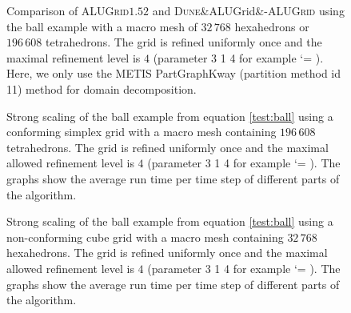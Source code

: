 \documentclass[10pt,notitlepage,a4paper]{article}
\makeatletter
\newcommand{\dune}[1][]{\textsc{Dune}\ifx&#1&\else\textsc{-{#1}}\fi\xspace}
\newcommand{\alugrid}{\textsc{ALUGrid}\xspace}
\newcommand{\code}[1]{ \lstinline[basicstyle=\small\sffamily]{#1} }
\renewcommand\lstinline[1][]{\leavevmode\bgroup \def\lst@boxpos{b}\lsthk@PreSet\lstset{flexiblecolumns,#1}\lsthk@TextStyle
          \ifnum\iffalse{\fi`}=\z@\fi
          \@ifnextchar\bgroup{\ifnum`{=\z@}\fi \afterassignment\lst@InlineG \let\@let@token}{\ifnum`{=\z@}\fi\lstinline@}}
\makeatother
\begin{document}
\begin{figure}[!ht]
\caption{Comparison of \alugrid $1.52$ and \dune[ALUGrid] using the
         ball example with a macro mesh of $32\,768$ hexahedrons or $196\,608$ tetrahedrons.
         The grid is refined uniformly once and the maximal refinement level is
         $4$ (parameter 3 1 4  for example \code{main_ball}).
         Here, we only use the METIS PartGraphKway (partition method id 11)
         method for domain decomposition.}
\label{fig:scaling314_comparison}
\end{figure}
\begin{figure}[!ht]
\caption{Strong scaling of the 
          ball example from equation \eqref{test:ball} using a conforming simplex grid with 
         a macro mesh containing $196\,608$ tetrahedrons.
         The grid is refined uniformly once and the maximal allowed refinement level is
         $4$ (parameter 3 1 4  for example \code{main_ball}).
         The graphs show the average run time per time step of different parts of the
         algorithm.}
\label{fig:scaling314_conf}         
\end{figure}
\begin{figure}[!ht]
  \caption{Strong scaling of the ball example from equation \eqref{test:ball} using a non-conforming cube grid with
         a macro mesh containing $32\,768$ hexahedrons.
         The grid is refined uniformly once and the maximal allowed refinement level is
         $4$ (parameter 3 1 4  for example \code{main_ball}).
         The graphs show the average run time per time step of different parts of the
         algorithm.}
\label{fig:scaling314_cube}         
\end{figure}
\end{document}
